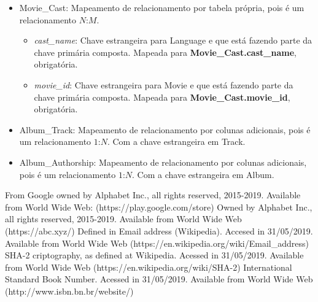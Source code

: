 \documentclass[a4paper, 11pt]{article}
\begin{document}
\begin{itemize}
\begin{itemize}
    \end{itemize}
    \item Movie\_Cast: Mapeamento de relacionamento por tabela própria, pois é um relacionamento $N$:$M$.
    \begin{itemize}
        \item {\textit{cast\_name}}: Chave estrangeira para Language e que está fazendo parte da chave primária composta. Mapeada para {\textbf{Movie\_Cast.cast\_name}}, obrigatória.
        \item {\textit{movie\_id}}: Chave estrangeira para Movie e que está fazendo parte da chave primária composta. Mapeada para {\textbf{Movie\_Cast.movie\_id}}, obrigatória.
    \end{itemize}
    \item Album\_Track: Mapeamento de relacionamento por colunas adicionais, pois é um relacionamento $1$:$N$. Com a chave estrangeira em Track.
    \item Album\_Authorship: Mapeamento de relacionamento por colunas adicionais, pois é um relacionamento $1$:$N$. Com a chave estrangeira em Album.
    
        
\end{itemize}

\newpage
\newpage
\begin{thebibliography}{9}
 From Google owned by Alphabet Inc., all rights reserved, 2015-2019. Available from World Wide Web: (https://play.google.com/store)
 Owned by Alphabet Inc., all rights reserved, 2015-2019. Available from World Wide Web (https://abc.xyz/)
 Defined in Email address (Wikipedia). Accesed in 31/05/2019. Available from World Wide Web (https://en.wikipedia.org/wiki/Email\_address)
 SHA-2 criptography, as defined at Wikipedia. Acessed in 31/05/2019. Available from World Wide Web (https://en.wikipedia.org/wiki/SHA-2)
 International Standard Book Number. Acessed in 31/05/2019. Available from World Wide Web (http://www.isbn.bn.br/website/) 
\end{thebibliography}
\end{document}
